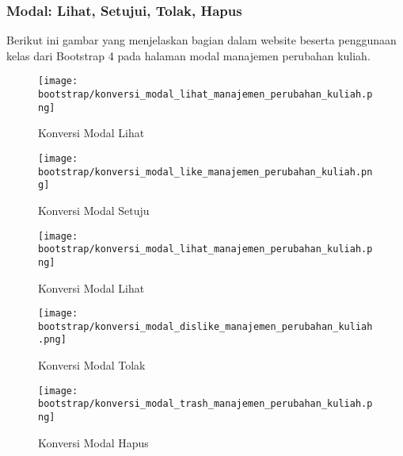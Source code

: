 \subsubsection{Modal: Lihat, Setujui, Tolak, Hapus}

\noindent Berikut ini gambar yang menjelaskan bagian dalam website beserta penggunaan kelas dari Bootstrap 4 pada halaman modal manajemen perubahan kuliah.\\
\begin{figure} [H]
	\centering  
	\texttt{[image: bootstrap/konversi\_modal\_lihat\_manajemen\_perubahan\_kuliah.png]}
	\caption{Konversi Modal Lihat}
\end{figure}

\begin{figure} [H]
	\centering  
	\texttt{[image: bootstrap/konversi\_modal\_like\_manajemen\_perubahan\_kuliah.png]}
	\caption{Konversi Modal Setuju}
\end{figure}

\begin{figure} [H]
	\centering  
	\texttt{[image: bootstrap/konversi\_modal\_lihat\_manajemen\_perubahan\_kuliah.png]}
	\caption{Konversi Modal Lihat}
\end{figure}


\begin{figure} [H]
	\centering  
	\texttt{[image: bootstrap/konversi\_modal\_dislike\_manajemen\_perubahan\_kuliah.png]}
	\caption{Konversi Modal Tolak}
\end{figure}

\begin{figure} [H]
	\centering  
	\texttt{[image: bootstrap/konversi\_modal\_trash\_manajemen\_perubahan\_kuliah.png]}
	\caption{Konversi Modal Hapus}
\end{figure}


